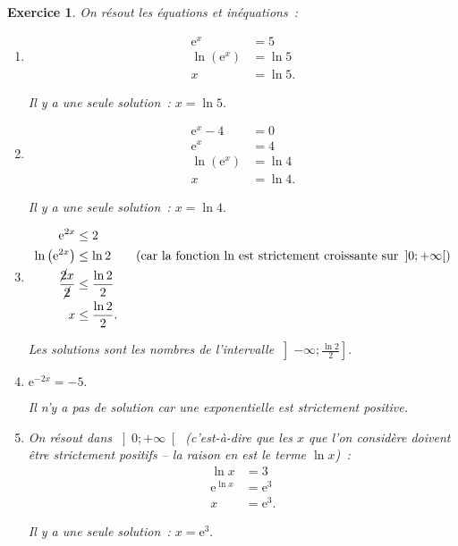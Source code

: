 \documentclass[10pt]{article}
\newtheorem{exo}{Exercice}
\begin{document}
\begin{exo}

On résout les équations et inéquations~:



\begin{enumerate}
\item \begin{align*}\text{e}^x&=5\\
\ln\left(\text{e}^x\right)&=\ln 5\\
x&=\ln 5.
\end{align*}

Il y a une seule solution~: $x=\ln 5.$
\item \begin{align*}\text{e}^x-4&=0\\
\text{e}^x&=4\\
\ln\left(\text{e}^x\right)&=\ln 4\\
x&=\ln 4.
\end{align*}

Il y a une seule solution~: $x=\ln 4.$

\item \begin{align*}\text{e}^{2x}&\leq 2\\
\ln\left(\text{e}^{2x}\right)&\leq \ln 2\qquad \text{(car la fonction $\ln$ est strictement croissante sur }\left]0;+\infty\right[)\\
\frac{\cancel{2}x}{\cancel{2}}&\leq \frac{\ln 2}{2}\\
x&\leq \frac{\ln 2}{2}.
\end{align*}

Les solutions sont les nombres de l'intervalle $\left]-\infty;\frac{\ln 2}{2}\right].$


\item $\text{e}^{-2x}=-5.$

Il n'y a pas de solution car une exponentielle est strictement positive.

\item On résout dans $\left]0;+\infty\right[$ (c'est-à-dire que les $x$ que l'on considère doivent être strictement positifs -- la raison en est le terme $\ln x$)~:
\begin{align*}\ln x&=3\\
\text{e}^{\ln x}&=\text{e}^{3}\\
x&=\text{e}^{3}.
\end{align*}

Il y a une seule solution~: $x=\text{e}^{3}.$


\end{enumerate}
\end{exo}
\end{document}
